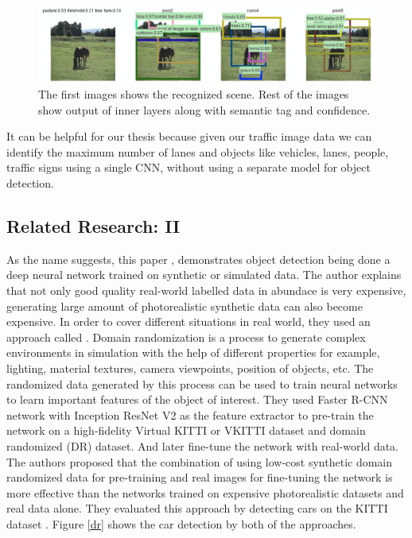 \begin{figure}[H]
  \centering
  \includegraphics[scale=0.40]{images/Chapter1/places_cnn.png}
  \caption{The first images shows the recognized scene. Rest of the images show output of inner layers along with semantic tag and confidence.}
  \label{fig:places_cnn}
\end{figure}

\par
It can be helpful for our thesis because given our traffic image data we can identify the maximum number of lanes and objects like vehicles, lanes, people, traffic signs using a single CNN, without using a separate model for object detection.

\subsection{Related Research: II}
As the name  suggests, this paper \cite{Training_Deep_Networks_with_Synthetic_Data}, demonstrates object detection being done a deep neural network trained on synthetic or simulated data. The author explains that not only good quality real-world labelled data in abundace is very expensive, generating large amount of photorealistic synthetic data can also become expensive. In order to cover different situations in real world, they used an approach called  \cite{domain_randomization}. Domain randomization is a process to generate complex environments in simulation with the help of different properties for example, lighting, material textures, camera viewpoints, position of objects, etc. The randomized data generated by this process can be used to train neural networks to learn important features of the object of interest. They used Faster R-CNN network with Inception ResNet V2 as the feature extractor to pre-train the network on a high-fidelity Virtual KITTI or VKITTI dataset \cite{VKITTI} and domain randomized (DR) dataset. And later fine-tune the network with real-world data. The authors proposed that the combination of using low-cost synthetic domain randomized data for pre-training and real images for fine-tuning the network is more effective than the networks trained on expensive photorealistic datasets and real data alone. They evaluated this approach by detecting cars on the KITTI dataset \cite{KITTI}. Figure \ref{dr} shows the car detection by both of the approaches.

